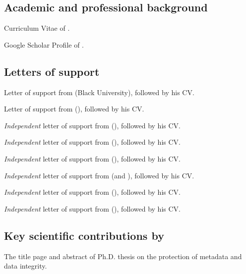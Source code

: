 \renewcommand\refname{List of Exhibits}

\begin{thebibliography}{25}
\label{list-exhibits}

\subsection*{Academic and professional background}
Curriculum Vitae of \drfull.

Google Scholar Profile of \drfull.

\subsection*{Letters of support}

Letter of support from \aaa (Black University), followed by his CV.

Letter of support from \bbb (\reduni), followed by his CV.

\emph{Independent} letter of support from \ccc (\blueuni), followed by his CV.

\emph{Independent} letter of support from \ddd(\yellowuni), followed by his CV.

\emph{Independent} letter of support from \eee (\whiteuni), followed by
his CV.

\emph{Independent} letter of support from \fff (\purpleinc and \cyanuni),
followed by his CV. 

\emph{Independent} letter of support from \ggg (\violetinc), followed by his CV.

\emph{Independent} letter of support from \jjj (\violetinc), followed by his CV.



\subsection*{Key scientific contributions by \drfull}

The title page and abstract of \drs Ph.D. thesis on the protection of metadata
and data integrity.


\end{thebibliography}
